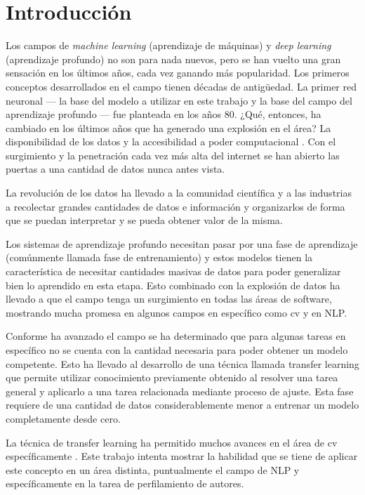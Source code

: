 
\section{Introducción}

Los campos de \emph{\gls{machine learning}} (aprendizaje de máquinas) y \emph{\gls{deep learning}} (\gls{aprendizaje profundo}) \parencite{lecun2015deep} no son para nada nuevos, pero se han vuelto una gran sensación en los últimos años, cada vez ganando más popularidad. Los primeros conceptos desarrollados en el campo tienen décadas de antigüedad. La primer \gls{red neuronal} --- la base del modelo a utilizar en este trabajo y la base del campo del aprendizaje profundo --- fue planteada en los años 80. ¿Qué, entonces, ha cambiado en los últimos años que ha generado una explosión en el área? La disponibilidad de los datos y la accesibilidad a poder computacional \parencite{jordan2015machine}. Con el surgimiento y la penetración cada vez más alta del internet se han abierto las puertas a una cantidad de datos nunca antes vista.

La revolución de los datos ha llevado a la comunidad científica y a las industrias a recolectar grandes cantidades de datos e información y organizarlos de forma que se puedan interpretar y se pueda obtener valor de la misma.

Los sistemas de aprendizaje profundo necesitan pasar por una fase de aprendizaje (comúnmente llamada fase de \gls{entrenamiento}) y estos modelos tienen la característica de necesitar cantidades masivas de datos para poder generalizar bien lo aprendido en esta etapa. Esto combinado con la explosión de datos ha llevado a que el campo tenga un surgimiento en todas las áreas de software, mostrando mucha promesa en algunos campos en específico como \gls{cv} \parencite{hoo2016deep} y en NLP.

Conforme ha avanzado el campo se ha determinado que para algunas tareas en específico no se cuenta con la cantidad necesaria para poder obtener un modelo competente. Esto ha llevado al desarrollo de una técnica llamada transfer learning que permite utilizar conocimiento previamente obtenido al resolver una tarea general y aplicarlo a una tarea relacionada mediante proceso de ajuste. Esta fase requiere de una cantidad de datos considerablemente menor a entrenar un modelo completamente desde cero.

La técnica de transfer learning ha permitido muchos avances en el área de \gls{cv} específicamente \parencite{hoo2016deep}. Este trabajo intenta mostrar la habilidad que se tiene de aplicar este concepto en un área distinta, puntualmente el campo de NLP y específicamente en la tarea de \gls{perfilamiento de autores}.

